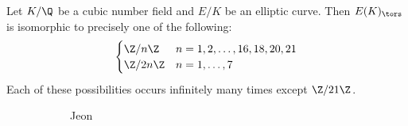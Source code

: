 \begin{frame}[plain]
\begin{thm}
Let $K/\Q$ be a cubic number field and $E/K$ be an elliptic curve. Then $E(K)_\tors$ is isomorphic to precisely one of the following:
	\[
	\begin{cases}
	\Z/n\Z & n=1,2,\ldots,16,18,20,21 \\
	\Z/2n\Z & n=1,\ldots,7
	\end{cases}
	\]
Each of these possibilities occurs infinitely many times except $\Z/21\Z$.
\end{thm}
	\begin{figure}[h]
	\centering
	\begin{subfigure}{0.10\textwidth}
	\captionsetup{labelformat=empty}
	\centering
	\caption{\hspace{0.2cm}\scriptsize{Jeon}}
	\end{subfigure} \quad\quad
	\begin{subfigure}{0.10\textwidth}
	\captionsetup{labelformat=empty}
	\centering

\end{subfigure}
\end{figure}
\end{frame}
